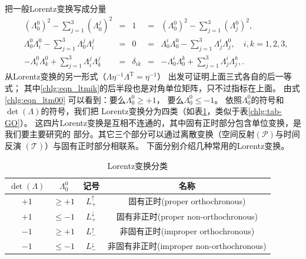 把一般Lorentz变换写成分量
\begin{align}
    & (\Lambda^{0}_{0})^2 -\sum_{j=1}^{3} (\Lambda^{j}_{0})^2 &= & 1
    &{=}& (\Lambda^{0}_{0})^2 -\sum_{j=1}^{3} ({\Lambda^0_{j}})^2 , \label{chlg:eqn_ltm00} \\
    & \Lambda^{0}_{0} \Lambda^{0}_{i} - \sum_{j=1}^{3} \Lambda^{j}_{0}
    \Lambda^{j}_{i} &= &0 &{=}& \Lambda^{i}_{0} \Lambda^{0}_{0}
    - \sum_{j=1}^{3} \Lambda^{i}_{j}   \Lambda^{0}_{j},
    \quad i,k=1,2,3, \label{chlg:eqn_ltm0i}  \\
    & -\Lambda^{0}_{i} \Lambda^{0}_{k} + \sum_{j=1}^{3} \Lambda^{j}_{i}
    \Lambda^{j}_{k} &= &\delta_{ik} &{=}& -\Lambda^{i}_{0} \Lambda^{k}_{0}
    + \sum_{j=1}^{3} \Lambda^{i}_{j}  \Lambda^{k}_{j},
    \label{chlg:eqn_ltmik} .
\end{align}
从Lorentz变换的另一形式（$\Lambda \eta^{-1}\Lambda ^{\mathrm{T}}  =\eta^{-1}$）
出发可证明上面三式各自的后一等式；
其中\eqref{chlg:eqn_ltmik}的后半段也是对角单位矩阵，只不过指标在上面。
由式\eqref{chlg:eqn_ltm00} 可以看到：要么$\Lambda^{0}_{0} \geqslant +1$，
要么$\Lambda^{0}_{0} \leqslant -1$。
依照$\Lambda^{0}_{0}$的符号和$\det(\Lambda)$的符号，我们把
Lorentz变换分为四类（如表\ref{chlg:tab_lorentz}，类似于表\ref{chlg:tab-GO}）。
这四片Lorentz变换是互相不连通的，其中固有正时部分包含单位变换，是我们要主要研究的
部分。其它三个部分可以通过离散变换（空间反射$(\mathcal{P})$与时间反演
$(\mathcal{T})$）与固有正时部分相联系。
下面分别介绍几种常用的Lorentz变换。

\begin{table}[!htb]
    \centering
    \caption{Lorentz变换分类} \label{chlg:tab_lorentz}
    \begin{tabular}{|c|c|c|c|}
        \hline
        $\det(\Lambda)$ & $\Lambda^{0}_{0}$ & 记号 & 名称 \\ \hline
        $+1$ & $\geqslant +1$ &    $L^{\uparrow}_{+}$   & 固有正时(proper orthochronous) \\ \hline
        $+1$ & $\leqslant -1$ &    $L^{\downarrow}_{+}$ & 固有非正时(proper non-orthochronous) \\ \hline
        $-1$ & $\geqslant +1$ &    $L^{\uparrow}_{-}$   & 非固有正时(improper orthochronous) \\ \hline
        $-1$ & $\leqslant -1$ &    $L^{\downarrow}_{-}$ & 非固有非正时(improper non-orthochronous) \\ \hline
    \end{tabular}
\end{table}

